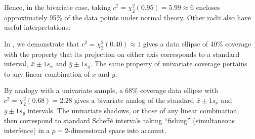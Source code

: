Hence, in the bivariate case, taking $c^2 = \chi^2_2(0.95)= 5.99 \approx 6$ encloses approximately
95\% of the data points under normal theory.  Other radii also have useful interpretations:
\begin{itemize*}
\item In , we demonstrate that $c^2 = \chi^2_2(0.40) \approx 1$ gives
a data ellipse of 40\% coverage with the property that its projection on either axis
corresponds to a standard interval, $\bar{x} \pm 1 s_x$ and $\bar{y} \pm 1 s_y$.  The same property of univariate
coverage pertains to
any linear combination of $x$ and $y$.
\item By analogy with a univariate sample, a 68\% coverage data ellipse with
$c^2 = \chi^2_2(0.68) = 2.28$ gives a bivariate analog of the standard $\bar{x} \pm 1 s_x$ and $\bar{y} \pm 1 s_y$ intervals.
The univariate shadows, or those of any linear combination, then correspond to standard Scheff\'e
intervals taking ``fishing'' (simultaneous interfence) in a $p=2$-dimensional space into account.
\end{itemize*}


